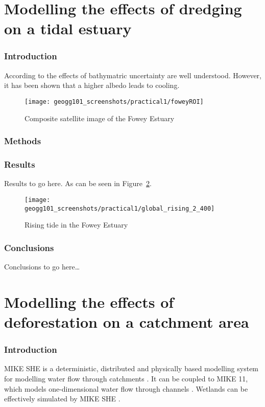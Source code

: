 \documentclass{article}
\begin{document}
\part*{Modelling the effects of dredging on a tidal estuary}

\section{Introduction}
According to \textcite{cea2012bathymetric} the effects of bathymatric uncertainty are well understood. However, it has been shown that a higher albedo leads to cooling.

\begin{figure}[hbp]
    \centering
    \texttt{[image: geogg101\_screenshots/practical1/foweyROI]}
    \caption{Composite satellite image of the Fowey Estuary}
    \label{fig:fowey_estuary}
\end{figure}

\section{Methods}

\section{Results}
Results to go here. As can be seen in Figure~\ref{fig:rising_tide}.

\begin{figure}[hbp]
    \centering
    \texttt{[image: geogg101\_screenshots/practical1/global\_rising\_2\_400]}
    \caption{Rising tide in the Fowey Estuary}
    \label{fig:rising_tide}
\end{figure}

\section{Conclusions}
Conclusions to go here\ldots

\printbibliography[filter=practical1]

\newpage
\setcounter{section}{0}

\part*{Modelling the effects of deforestation on a catchment area}

\section{Introduction}
MIKE SHE is a deterministic, distributed and physically based modelling system for modelling water flow through catchments \parencite{refshaard1995mike}. It can be coupled to MIKE 11, which models one-dimensional water flow through channels \parencite{havno1995mike}. Wetlands can be effectively simulated by MIKE SHE \parencite{thompson2004simulation}. 
\end{document}
